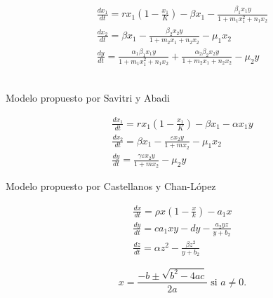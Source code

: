 \documentclass{wscpaperproc}
\theoremstyle{wsc}
\begin{document}
\begin{equation} \label{twoPreyonePredator_Falconi}
	\begin{gathered}
		\frac{d x_1}{d t}=r x_1\left(1-\frac{x_1}{K}\right)-\beta x_1-\frac{\beta_1 x_1 y}{1+m_1 x_1^2+n_1 x_2} \\
		\frac{d x_2}{d t}=\beta x_1-\frac{\beta_2 x_2 y}{1+m_2 x_1+n_2 x_2}-\mu_1 x_2                           \\
		\frac{d y}{d t}=\frac{\alpha_1 \beta_1 x_1 y}{1+m_1 x_1^2+n_1 x_2}+\frac{\alpha_2 \beta_2 x_2 y}{1+m_2 x_1+n_2 x_2}-\mu_2 y
	\end{gathered}
\end{equation}
\\
\begin{center}
	Modelo propuesto por Savitri y Abadi
	\\
\end{center}
\begin{equation} \label{Holling1y2_Abadi}
	\begin{gathered}
		\frac{d x_1}{d t}=r x_1\left(1-\frac{x_1}{K}\right)-\beta x_1-\alpha x_1 y \\
		\frac{d x_2}{d t}=\beta x_1-\frac{\varepsilon x_2 y}{1+m x_2}-\mu_1 x_2 \\
		\frac{d y}{d t}=\frac{\gamma \varepsilon x_2 y}{1+m x_2}-\mu_2 y
	\end{gathered}
\end{equation}

\begin{center}
	Modelo propuesto por Castellanos y Chan-López
\end{center}
\begin{equation} \label{Holling1y2_Castellanos}
	\begin{gathered}
		\frac{d x}{d t}=\rho x\left(1-\frac{x}{k}\right)-a_1 x \\
		\frac{d y}{d t}=c a_1 x y-d y-\frac{a_2 y z}{y+b_2} \\
		\frac{d z}{d t}=\alpha z^2-\frac{\beta z^2}{y+b_2}
	\end{gathered}
\end{equation}


\begin{equation} \label{eq:quadraticsol}
	x = \frac{-b \pm \sqrt{b^2-4ac}}{2a} \mbox{ si } a \ne 0.
\end{equation}
\end{document}
